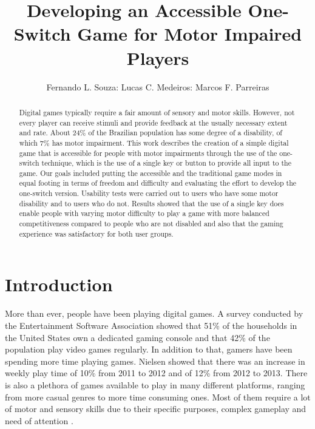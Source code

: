\documentclass[a4paper]{sbgames}               %
\title{Developing an Accessible One-Switch Game for Motor Impaired Players}
\author{Fernando L. Souza: Lucas C. Medeiros: Marcos F. Parreiras}
\affiliation{ Centro Federal de Educa\c{c}\~{a}o Tecnol\'{o}gica de Minas Gerais, Departamento de Computa\c{c}\~{a}o, Brasil
}
\begin{document}


\maketitle


\begin{abstract}

Digital games typically require a fair amount of sensory and motor skills.  However, not every player can receive stimuli and provide feedback at the usually necessary extent and rate.  About 24\% of the Brazilian population has some degree of a disability, of which 7\% has motor impairment.  This work describes the creation of a simple digital game that is accessible for people with motor impairments through the use of the one-switch technique, which is the use of a single key or button to provide all input to the game. Our goals included putting the accessible and the traditional game modes in equal footing in terms of freedom and difficulty and evaluating the effort to develop the one-switch version.  Usability tests were carried out to users who have some motor disability and to users who do not. Results showed that the use of a single key does enable people with varying motor difficulty to play a game with more balanced competitiveness compared to people who are not disabled and also that the gaming experience was satisfactory for both user groups.
\end{abstract}

\keywordlist
\contactlist

\section{Introduction}

More than ever, people have been playing digital games. A survey conducted by the Entertainment Software Association  showed that 51\% of the households in the United States own a dedicated gaming console and that 42\% of the population play video games regularly. In addition to that, gamers have been spending more time playing games. Nielsen  showed that there was an increase in weekly play time of 10\% from 2011 to 2012 and of 12\% from 2012 to 2013. There is also a plethora of games available to play in many different platforms, ranging from more casual genres to more time consuming ones. Most of them require a lot of motor and sensory skills due to their specific purposes, complex gameplay and need of attention \cite{bierre2004accessibility}.
\end{document}
